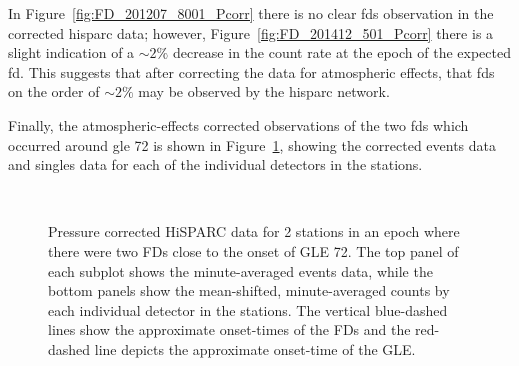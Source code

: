 In Figure~\ref{fig:FD_201207_8001_Pcorr} there is no clear \glspl{fd} observation in the corrected \gls{hisparc} data; however, Figure~\ref{fig:FD_201412_501_Pcorr} there is a slight indication of a $\sim2\%$ decrease in the count rate at the epoch of the expected \gls{fd}. This suggests that after correcting the data for atmospheric effects, that \glspl{fd} on the order of $\sim 2\%$ may be observed by the \gls{hisparc} network.

Finally, the atmospheric-effects corrected observations of the two \glspl{fd} which occurred around \gls{gle} 72 is shown in Figure~\ref{fig:FD_GLE72_Pcorr}, showing the corrected events data and singles data for each of the individual detectors in the stations.

\begin{figure}[ht]
	\centering
	 \\
	
	
	\caption{Pressure corrected HiSPARC data for 2 stations in an epoch where there were two FDs close to the onset of GLE 72. The top panel of each subplot shows the minute-averaged events data, while the bottom panels show the mean-shifted, minute-averaged counts by each individual detector in the stations. The vertical blue-dashed lines show the approximate onset-times of the FDs and the red-dashed line depicts the approximate onset-time of the GLE.}
	\label{fig:FD_GLE72_Pcorr}
\end{figure}

